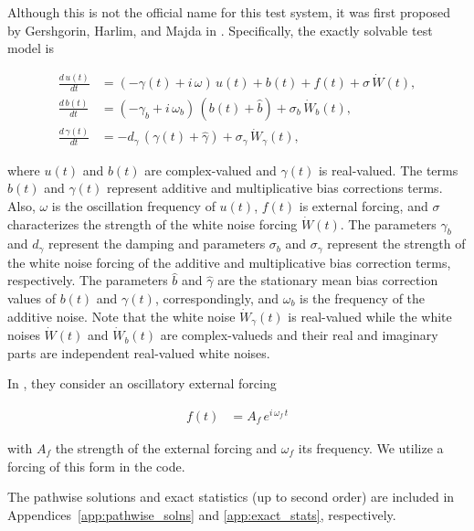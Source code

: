 Although this is not the official name for this test system, it was first proposed by Gershgorin, Harlim, and Majda in \cite{Gershgorin10}. Specifically, the exactly solvable test model is

\begin{align}
	\frac{d\,u\left( t \right)}{dt} &= \left( -\gamma\left( t \right) + i\,\omega \right)\,u\left( t \right) + b\left( t \right) + f\left( t \right) + \sigma\,\dot{W}\left( t \right), \label{eqn:diff_b}\\
	\frac{d\,b\left( t \right)}{dt} &= \left( -\gamma_{b} + i\,\omega_{b} \right)\,\left( b\left( t \right) + \widehat{b} \right) + \sigma_{b}\,\dot{W}_{b}\left( t \right), \label{eqn:diff_gamma}\\
	\frac{d\,\gamma\left( t \right)}{dt} &= -d_{\gamma}\,\left( \gamma\left( t \right) + \widehat{\gamma} \right) + \sigma_{\gamma}\,\dot{W}_{\gamma}\left( t \right), \label{eqn:diff_u}
\end{align}

where $u\left( t \right)$ and $b\left( t \right)$ are complex-valued and $\gamma\left( t \right)$ is real-valued. The terms $b\left( t \right)$ and $\gamma\left( t \right)$ represent additive and multiplicative bias corrections terms. Also, $\omega$ is the oscillation frequency of $u\left( t \right)$, $f\left( t \right)$ is external forcing, and $\sigma$ characterizes the strength of the white noise forcing $\dot{W}\left( t \right)$. The parameters $\gamma_{b}$ and $d_{\gamma}$ represent the damping and parameters $\sigma_{b}$ and $\sigma_{\gamma}$ represent the strength of the white noise forcing of the additive and multiplicative bias correction terms, respectively. The parameters $\widehat{b}$ and $\widehat{\gamma}$ are the stationary mean bias correction values of $b\left( t \right)$ and $\gamma\left( t \right)$, correspondingly, and $\omega_{b}$ is the frequency of the additive noise. Note that the white noise $\dot{W}_{\gamma}\left( t \right)$ is real-valued while the white noises $\dot{W}\left( t \right)$ and $\dot{W}_{b}\left( t \right)$ are complex-valueds and their real and imaginary parts are independent real-valued white noises.

In \cite{Gershgorin10}, they consider an oscillatory external forcing

\begin{align}
	f\left( t \right) &= A_{f}\,e^{i\,\omega_{f}\,t}
\end{align}

with $A_f$ the strength of the external forcing and $\omega_f$ its frequency. We utilize a forcing of this form in the code.

The pathwise solutions and exact statistics (up to second order) are included in Appendices~\ref{app:pathwise_solns} and \ref{app:exact_stats}, respectively.

